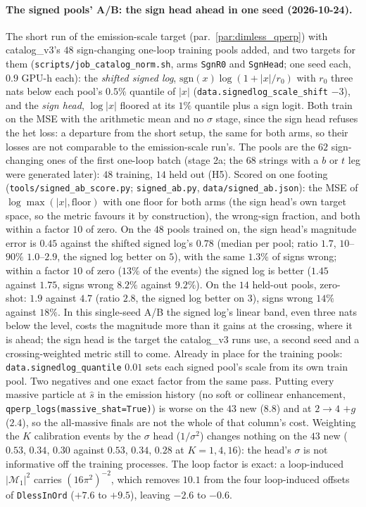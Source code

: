 \documentclass[11pt]{article}
\newcommand{\code}[1]{\texttt{#1}}
\begin{document}
\paragraph{The signed pools' A/B: the sign head ahead in one seed (2026-10-24).} The short run of the emission-scale
target (par.~\ref{par:dimless_qperp}) with catalog\_v3's $48$ sign-changing one-loop training pools added, and two targets
for them (\code{scripts/job\_catalog\_norm.sh}, arms \code{SgnR0} and \code{SgnHead}; one seed each, $0.9$ GPU-h each):
the \emph{shifted signed log}, $\mathrm{sgn}(x)\log(1+|x|/r_0)$ with $r_0$ three nats below each pool's $0.5\%$ quantile of
$|x|$ (\code{data.signedlog\_scale\_shift} $-3$), and the \emph{sign head}, $\log|x|$ floored at its $1\%$ quantile plus a
sign logit. Both train on the MSE with the arithmetic mean and no $\sigma$ stage, since the sign head refuses the het
loss: a departure from the short setup, the same for both arms, so their losses are not comparable to the emission-scale
run's. The pools are the $62$ sign-changing ones of the first one-loop batch (stage 2a; the $68$ strings with a $b$ or $t$
leg were generated later): $48$ training, $14$ held out (H5). Scored on one footing (\code{tools/signed\_ab\_score.py};
\code{signed\_ab.py}, \code{data/signed\_ab.json}): the MSE of $\log\max(|x|,\text{floor})$ with one floor for both arms
(the sign head's own target space, so the metric favours it by construction), the wrong-sign fraction, and both within a
factor $10$ of zero. On the $48$ pools trained on, the sign head's magnitude error is $0.45$ against the shifted signed
log's $0.78$ (median per pool; ratio $1.7$, $10$--$90\%$ $1.0$--$2.9$, the signed log better on $5$), with the same
$1.3\%$ of signs wrong; within a factor $10$ of zero ($13\%$ of the events) the signed log is better ($1.45$ against
$1.75$, signs wrong $8.2\%$ against $9.2\%$). On the $14$ held-out pools, zero-shot: $1.9$ against $4.7$ (ratio $2.8$,
the signed log better on $3$), signs wrong $14\%$ against $18\%$. In this single-seed A/B the signed log's linear band,
even three nats below the level, costs the magnitude more than it gains at the crossing, where it is ahead; the sign head
is the target the catalog\_v3 runs use, a second seed and a crossing-weighted metric still to come.
Already in place for the training pools: \code{data.signedlog\_quantile} $0.01$ sets each signed pool's scale from its
own train pool.
Two negatives and one exact factor from the same pass. Putting every massive particle at $\hat s$ in the emission history
(no soft or collinear enhancement, \code{qperp\_logs(massive\_shat=True)}) is worse on the $43$ new ($8.8$) and at $2\to4$
$+g$ ($2.4$), so the all-massive finals are not the whole of that column's cost. Weighting the $K$ calibration events by the
$\sigma$ head ($1/\sigma^2$) changes nothing on the $43$ new ($0.53$, $0.34$, $0.30$ against $0.53$, $0.34$, $0.28$ at
$K=1,4,16$): the head's $\sigma$ is not informative off the training processes. The loop factor is exact: a loop-induced
$|\mathcal M_1|^2$ carries $(16\pi^2)^{-2}$, which removes $10.1$ from the four loop-induced offsets of
\code{DlessInOrd} ($+7.6$ to $+9.5$), leaving $-2.6$ to $-0.6$.
\end{document}
